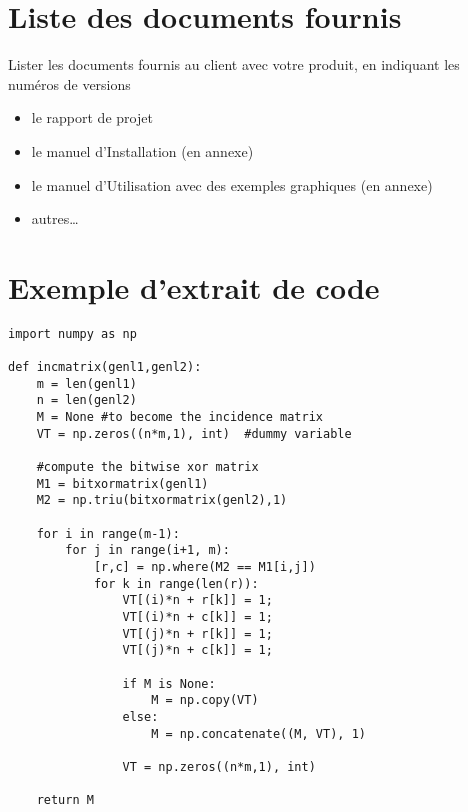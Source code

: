 \section{Liste des documents fournis}
Lister les documents fournis au client avec votre produit, en indiquant les numéros de versions 
\begin{itemize}
  \item le rapport de projet
  \item le manuel d'Installation (en annexe)
  \item le manuel d'Utilisation avec des exemples graphiques (en annexe)
  \item autres…
\end{itemize}

\section{Exemple d'extrait de code}
\begin{verbatim}
import numpy as np

def incmatrix(genl1,genl2):
    m = len(genl1)
    n = len(genl2)
    M = None #to become the incidence matrix
    VT = np.zeros((n*m,1), int)  #dummy variable

    #compute the bitwise xor matrix
    M1 = bitxormatrix(genl1)
    M2 = np.triu(bitxormatrix(genl2),1) 

    for i in range(m-1):
        for j in range(i+1, m):
            [r,c] = np.where(M2 == M1[i,j])
            for k in range(len(r)):
                VT[(i)*n + r[k]] = 1;
                VT[(i)*n + c[k]] = 1;
                VT[(j)*n + r[k]] = 1;
                VT[(j)*n + c[k]] = 1;
                    
                if M is None:
                    M = np.copy(VT)
                else:
                    M = np.concatenate((M, VT), 1)
                
                VT = np.zeros((n*m,1), int)
    
    return M
\end{verbatim}
